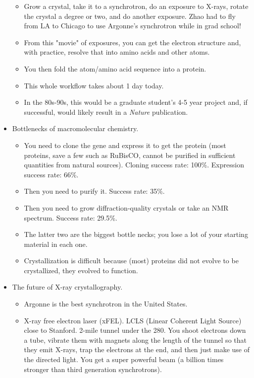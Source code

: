 \documentclass[../notes.tex]{subfiles}
\begin{document}
\begin{itemize}
\begin{itemize}
        \item Grow a crystal, take it to a synchrotron, do an exposure to X-rays, rotate the crystal a degree or two, and do another exposure. Zhao had to fly from LA to Chicago to use Argonne's synchrotron while in grad school!
        \item From this "movie" of exposures, you can get the electron structure and, with practice, resolve that into amino acids and other atoms.
        \item You then fold the atom/amino acid sequence into a protein.
        \item This whole workflow takes about 1 day today.
        \item In the 80s-90s, this would be a graduate student's 4-5 year project and, if successful, would likely result in a \emph{Nature} publication.
    \end{itemize}
    \item Bottlenecks of macromolecular chemistry.
    \begin{itemize}
        \item You need to clone the gene and express it to get the protein (most proteins, save a few such as RuBisCO, cannot be purified in sufficient quantities from natural sources). Cloning success rate: 100\%. Expression success rate: 66\%.
        \item Then you need to purify it. Success rate: 35\%.
        \item Then you need to grow diffraction-quality crystals or take an NMR spectrum. Success rate: 29.5\%.
        \item The latter two are the biggest bottle necks; you lose a lot of your starting material in each one.
        \item Crystallization is difficult because (most) proteins did not evolve to be crystallized, they evolved to function.
    \end{itemize}
    \item The future of X-ray crystallography.
    \begin{itemize}
        \item Argonne is the best synchrotron in the United States.
        \item X-ray free electron laser (xFEL). LCLS (Linear Coherent Light Source) close to Stanford. 2-mile tunnel under the 280. You shoot electrons down a tube, vibrate them with magnets along the length of the tunnel so that they emit X-rays, trap the electrons at the end, and then just make use of the directed light. You get a super powerful beam (a billion times stronger than third generation synchrotrons).

\end{itemize}
\end{itemize}
\end{document}
